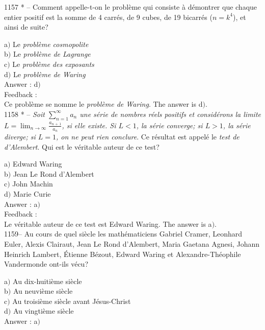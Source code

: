 ﻿\documentclass[letterpaper, 12pt]{article}
\begin{document}
1157 * -- Comment appelle-t-on le probl\`eme qui consiste \`a
d\'emontrer que chaque entier positif est la somme de 4 carr\'es, de
9 cubes, de 19 bicarr\'es ($n=k^4$), et ainsi de suite?

a$)$ Le {\sl probl\`eme cosmopolite} \\
b$)$ Le {\sl probl\`eme de Lagrange} \\
c$)$ Le {\sl probl\`eme des exposants} \\
d$)$ Le {\sl probl\`eme de Waring}\\

Answer : d$)$\\

Feedback : \\
Ce probl\`eme se nomme le {\sl probl\`eme de Waring}. The answer is
d$)$.\\

1158 * -- {\sl Soit $\sum_{n=1}^{\infty}a_n$ une s\'erie de nombres
r\'eels positifs et consid\'erons la limite
$L=\lim_{n\to\infty}\frac{a_{n\,+\,1}}{a_n}$, si elle existe. Si
$L<1$, la s\'erie converge; si $L>1$, la s\'erie diverge; si $L=1$,
on ne peut rien conclure}. Ce r\'esultat est appel\'e le {\sl test
de d'Alembert}. Qui est le v\'eritable auteur de ce test?

a$)$ Edward Waring \\
b$)$ Jean Le Rond d'Alembert \\
c$)$ John Machin \\
d$)$ Marie Curie\\

Answer : a$)$\\

Feedback : \\
Le v\'eritable auteur de ce test est Edward Waring. The answer is a$)$.\\

1159-- Au cours de quel si\`ecle les math\'ematiciens Gabriel
Cramer, Leonhard Euler, Alexis Clairaut, Jean Le Rond d'Alembert,
Maria Gaetana Agnesi, Johann Heinrich Lambert, \'Etienne B\'ezout,
Edward Waring et Alexandre-Th\'eophile Vandermonde ont-ils v\'ecu?

a$)$ Au dix-huiti\`eme si\`ecle \\
b$)$ Au neuvi\`eme si\`ecle \\
c$)$ Au troisi\`eme si\`ecle avant J\'esus-Christ \\
d$)$ Au vingti\`eme si\`ecle   \\

Answer : a$)$\\
\end{document}
